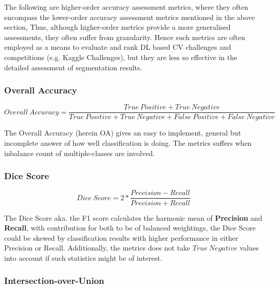 \documentclass[11pt, a4paper, twoside]{report}
\begin{document}
The following are higher-order accuracy assessment metrics, where they often encompass the lower-order accuracy assessment metrics mentioned in the above section, Thus, although higher-order metrics provide a more generalised assessments, they often suffer from granularity. Hence such metrics are often employed as a means to evaluate and rank DL based CV challenges and competitions (e.g. Kaggle Challenges), but they are less so effective in the detailed assessment of segmentation results.\\\par

\subsubsection{Overall Accuracy}\label{OA}

\tiny
\begin{equation}
  Overall\ Accuracy = \frac{True\ Positive + True\ Negative}{True\ Positive + True\ Negative + False\ Positive + False\ Negative}
\end{equation}
\normalsize

The Overall Accuracy (herein OA) gives an easy to implement, general but incomplete answer of how well classification is doing. The metrics suffers when inbalance count of multiple-classes are involved.\\\par

\subsubsection{Dice Score}\label{F1}

\begin{equation}
  Dice\ Score = 2 * \frac{Precision - Recall}{Precision + Recall}
\end{equation}

The Dice Score aka. the F1 score calculates the harmonic mean of \textbf{Precision} and \textbf{Recall}, with contribution for both to be of balanced weightings, the Dice Score could be skewed by classification results with higher performance in either Precision or Recall. Additionally, the metrics does not take $True\ Negative$ values into account if such statistics might be of interest.\\\par

\subsubsection{Intersection-over-Union}\label{IoU}
\end{document}
